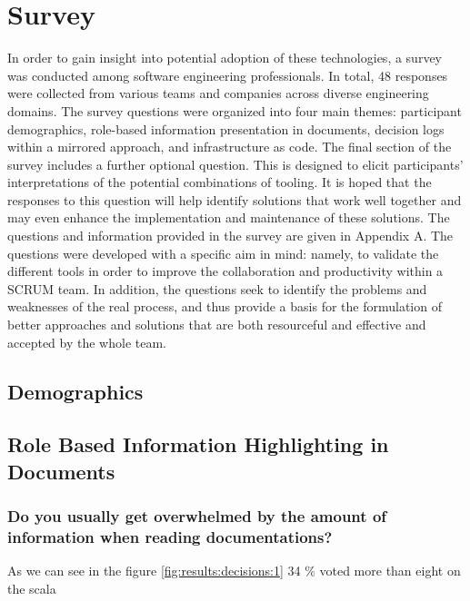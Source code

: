 

\chapter{Survey}

\label{Chapter4} %

In order to gain insight into potential adoption of these technologies, a survey was conducted among software engineering professionals. In total, 48 responses were collected from various teams and companies across diverse engineering domains. The survey questions were organized into four main themes: participant demographics, role-based information presentation in documents, decision logs within a mirrored approach, and infrastructure as code. The final section of the survey includes a further optional question. This is designed to elicit participants’ interpretations of the potential combinations of tooling. It is hoped that the responses to this question will help identify solutions that work well together and may even enhance the implementation and maintenance of these solutions.
The questions and information provided in the survey are given in Appendix A. The questions were developed with a specific aim in mind: namely, to validate the different tools in order to improve the collaboration and productivity within a SCRUM team. In addition, the questions seek to identify the problems and weaknesses of the real process, and thus provide a basis for the formulation of better approaches and solutions that are both resourceful and effective and accepted by the whole team.


\section{Demographics}


\section{Role Based Information Highlighting in Documents}

\subsection{Do you usually get overwhelmed by the amount of information when reading documentations?}
As we can see in the figure \ref{fig:results:decisions:1} 34 \% voted more than eight on the scala 


